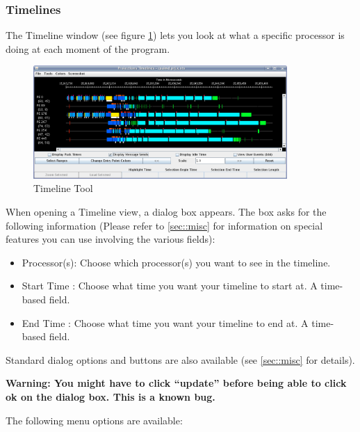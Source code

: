 \documentclass[10pt]{article}
\begin{document}
\subsubsection{Timelines}
\label{sec::timeline view}


The Timeline window (see figure \ref{timeline}) lets you look at what
a specific processor is doing at each moment of the program.

\begin{figure}[htb]
\center
\includegraphics[width=3.8in]{fig/timeline}
\caption{Timeline Tool}
\label{timeline}
\end{figure}


When opening a Timeline view, a dialog box appears. 
The box asks for the following information (Please refer to
\ref{sec::misc} for information on special features you can
use involving the various fields):

\begin{itemize}
\item
Processor(s): Choose which processor(s) you want to see in the timeline.
\item
Start Time  : Choose what time you want your timeline to start at.
A time-based field.
\item
End Time    : Choose what time you want your timeline to end at. A time-based
field.
\end{itemize}

Standard \projections{} dialog options and buttons are also available
(see \ref{sec::misc} for details).

\textbf{Warning: You might have to click ``update'' before being able
to click ok on the dialog box. This is a known bug.}



The following menu options are available:
\end{document}
